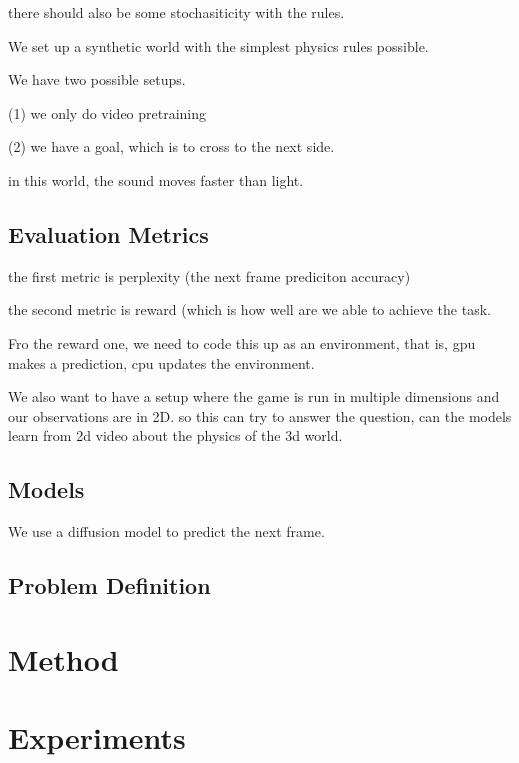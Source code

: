 there should also be some stochasiticity with the rules. 


\newpage



We set up a synthetic world with the simplest physics rules possible. 


We have two possible setups.

(1) we only do video pretraining


(2) we have a goal, which is to cross to the next side. 


in this world, the sound moves faster than light. 


\subsection{Evaluation Metrics}

the first metric is perplexity (the next frame prediciton accuracy)


the second metric is reward (which is how well are we able to achieve the task.



Fro the reward one, we need to code  this up as an environment, that is, gpu makes a prediction, cpu updates the environment.


We also want to have a setup where the game is run in multiple dimensions and our observations are in 2D. so this can try to answer the question, can the models learn from 2d video about the physics of the 3d world.

\subsection{Models}

We use a diffusion model to predict the next frame. 





\subsection{Problem Definition} 


\section{Method}

\section{Experiments}

